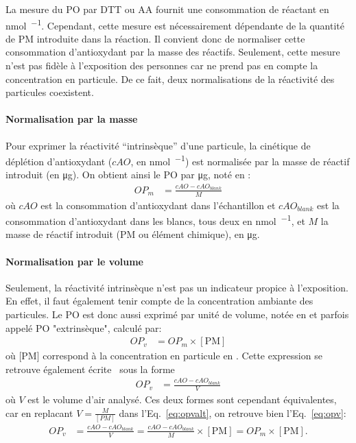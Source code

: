 La mesure du PO par DTT ou AA fournit une consommation de réactant en \si{\nmol\per\min}.
Cependant, cette mesure est nécessairement dépendante de la quantité de PM introduite dans
la réaction.
Il convient donc de normaliser cette consommation d'antioxydant par la masse des réactifs.
Seulement, cette mesure n'est pas fidèle à l'exposition des personnes car ne prend pas en
compte la concentration en particule. De ce fait, deux normalisations de la réactivité des
particules coexistent.

\paragraph{Normalisation par la masse}%
\label{par:normalisation_par_la_masse}
Pour exprimer la réactivité ``intrinsèque'' d'une particule, la cinétique de déplétion
d'antioxydant ($cAO$, en \si{\nmol\per\min}) est normalisée par la masse de réactif
introduit (en \si{\ug}). On obtient ainsi le PO par \si{\ug}, noté \OPm{} en
\si{\opm}:
\begin{align}
    \label{eq:opm}
    OP_m &= \frac{cAO - cAO_{blank}}{M}
\end{align}
où $cAO$ est la consommation d'antioxydant dans l'échantillon et $cAO_{blank}$
est la consommation d'antioxydant dans les blancs, tous deux en \si{\nmol\per\min}, et $M$
la masse de réactif introduit (PM ou élément chimique), en \si{\ug}.

\paragraph{Normalisation par le volume}%
\label{par:normalisation_par_le_volume}

Seulement, la réactivité intrinsèque n'est pas un indicateur propice à l'exposition. En
effet, il faut également tenir compte de la concentration ambiante des particules. Le PO
est donc aussi exprimé par unité de volume, notée \OPv{} en \si{\opv} et parfois appelé PO
"extrinsèque", calculé par:
\begin{align}
    \label{eq:opv}
    OP_v &= OP_m \times [\text{PM}]
\end{align}
où [PM] correspond à la concentration en particule en \si{\ugm}. Cette expression se
retrouve également écrite~\autocite{fangSemiautomated2015} sous la forme
\begin{align}
    \label{eq:opvalt}
    OP_v &= \frac{cAO - cAO_{blank}}{V}
\end{align}
où $V$ est le volume d'air analysé. Ces deux formes sont cependant équivalentes, car en
replacant $V = \frac{M}{[PM]}$ dans l'Eq.~\ref{eq:opvalt}, on retrouve bien
l'Eq.~\ref{eq:opv}:
\begin{align}
    \label{eq:opvopvalt}
    OP_v &= \frac{cAO -cAO_{blank}}{V} = \frac{cAO -cAO_{blank}}{M}\times [\text{PM}] = OP_m \times [\text{PM}].
\end{align}

